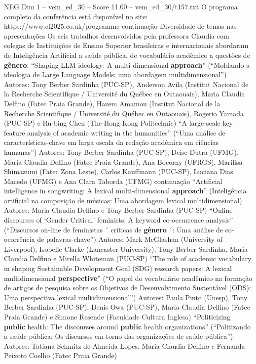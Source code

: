 \begin{textsample}{NEG Dim 1 – vem\_ed\_30 – Score 11.00 – vem\_ed\_30/t157.txt}
O programa completo da conferência está disponível no site: https://www.cl2025.co.uk/programme continuação Diversidade de temas nas apresentações Os seis trabalhos desenvolvidos pela professora Claudia com colegas de Instituições de Ensino Superior brasileiras e internacionais abordaram de Inteligência Artificial a saúde pública, de vocabulário acadêmico a questões de \textbf{gênero}. “Shaping LLM ideology: A multi-dimensional \textbf{approach}” (“Moldando a ideologia de Large Language Models: uma abordagem multidimensional”) Autores: Tony Berber Sardinha (PUC-SP), Anderson Avila (Institut Nacional de la Recherche Scientifique / Université du Québec en Outaouais), Maria Claudia Delfino (Fatec Praia Grande), Hazem Amamou (Institut Nacional de la Recherche Scientifique / Université du Québec en Outaouais), Rogerio Yamada (PUC-SP) e Ru-bing Chen (The Hong Kong Politechnic) “A large-scale key feature analysis of academic writing in the humanities” (“Uma análise de características-chave em larga escala da redação acadêmica em ciências humanas”) Autores: Tony Berber Sardinha (PUC-SP), Deise Dutra (UFMG), Maria Claudia Delfino (Fatec Praia Grande), Ana Bocorny (UFRGS), Marilisa Shimazumi (Fatec Zona Leste), Carlos Kauffmann (PUC-SP), Luciana Dias Macedo (UFMG) e Ana Clara Taborda (UFMG) continuação “Artificial intelligence in songwriting: A lexical multi-dimensional \textbf{approach}” (Inteligência artificial na composição de músicas: Uma abordagem lexical multidimensional) Autores: Maria Claudia Delfino e Tony Berber Sardinha (PUC-SP) “Online discourses of ‘Gender Critical’ feminists: A keyword co-occurrence analysis” (“Discursos on-line de feministas ´ críticas de \textbf{gênero} ´: Uma análise de co-ocorrência de palavras-chave”) Autores: Mark McGlashan (University of Liverpool), Isobelle Clarke (Lancaster University), Tony Berber-Sardinha, Maria Claudia Delfino e Mirella Whiteman (PUC-SP) “The role of academic vocabulary in shaping Sustainable Development Goal (SDG) research papers: A lexical multidimensional \textbf{perspective}” (“O papel do vocabulário acadêmico na formação de artigos de pesquisa sobre os Objetivos de Desenvolvimento Sustentável (ODS): Uma perspectiva lexical multidimensional”) Autores: Paula Pinto (Unesp), Tony Berber Sardinha (PUC-SP), Denis Owa (PUC-SP), Maria Claudia Delfino (Fatec Praia Grande) e Simone Resende (Faculdade Cultura Inglesa) “Politicizing \textbf{public} health: The discourses around \textbf{public} health organizations” (“Politizando a saúde pública: Os discursos em torno das organizações de saúde pública”) Autores: Tatiana Schmitz de Almeida Lopes, Maria Claudia Delfino e Fernanda Peixoto Coelho (Fatec Praia Grande)

\end{textsample}
